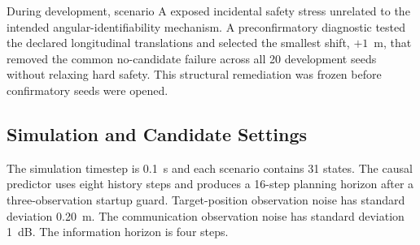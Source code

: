 \documentclass[journal]{IEEEtran}
\begin{document}
\begin{table}[t]
\caption{Declared scenarios. Broad denotes the $3\times3\times3$ support in Section IV; narrow denotes $\alpha\in\{0.97,1,1.03\}$, $\delta\in\{-0.01,0,0.01\}$ rad, and $k\in\{0.95,1,1.05\}$.}
\label{tab:scenarios}
\centering
\small
{}
\end{table}

During development, scenario A exposed incidental safety stress unrelated to the intended angular-identifiability mechanism. A preconfirmatory diagnostic tested the declared longitudinal translations and selected the smallest shift, $+1$~m, that removed the common no-candidate failure across all 20 development seeds without relaxing hard safety. This structural remediation was frozen before confirmatory seeds were opened.

\subsection{Simulation and Candidate Settings}
The simulation timestep is 0.1~s and each scenario contains 31 states. The causal predictor uses eight history steps and produces a 16-step planning horizon after a three-observation startup guard. Target-position observation noise has standard deviation 0.20~m. The communication observation noise has standard deviation 1~dB. The information horizon is four steps.
\end{document}
